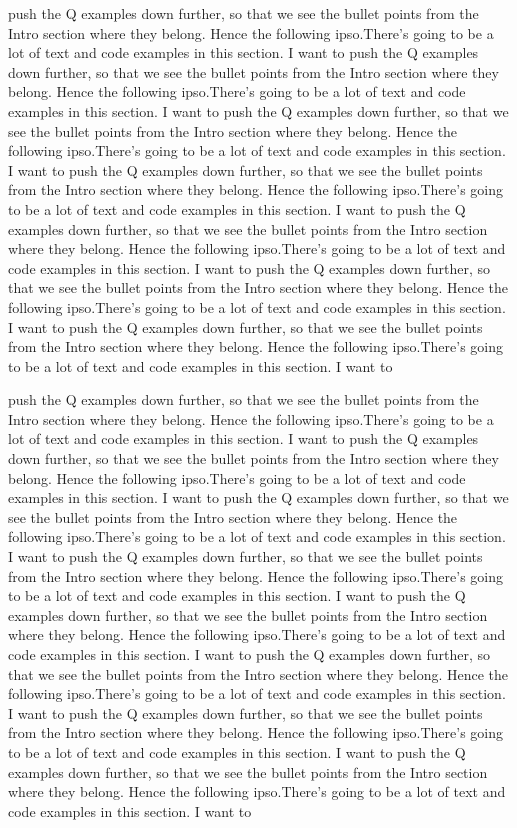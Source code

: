 \documentclass[preprint]{sigplanconf}
\begin{document}
push the Q examples down further, so that we see the bullet points from the
Intro section where they belong.  Hence the following ipso.There's going to be a
lot of text and code examples in this section.  I want to
push the Q examples down further, so that we see the bullet points from the
Intro section where they belong.  Hence the following ipso.There's going to be a
lot of text and code examples in this section.  I want to
push the Q examples down further, so that we see the bullet points from the
Intro section where they belong.  Hence the following ipso.There's going to be a
lot of text and code examples in this section.  I want to
push the Q examples down further, so that we see the bullet points from the
Intro section where they belong.  Hence the following ipso.There's going to be a
lot of text and code examples in this section.  I want to
push the Q examples down further, so that we see the bullet points from the
Intro section where they belong.  Hence the following ipso.There's going to be a
lot of text and code examples in this section.  I want to
push the Q examples down further, so that we see the bullet points from the
Intro section where they belong.  Hence the following ipso.There's going to be a
lot of text and code examples in this section.  I want to
push the Q examples down further, so that we see the bullet points from the
Intro section where they belong.  Hence the following ipso.There's going to be a
lot of text and code examples in this section.  I want to

push the Q examples down further, so that we see the bullet points from the
Intro section where they belong.  Hence the following ipso.There's going to be a
lot of text and code examples in this section.  I want to
push the Q examples down further, so that we see the bullet points from the
Intro section where they belong.  Hence the following ipso.There's going to be a
lot of text and code examples in this section.  I want to
push the Q examples down further, so that we see the bullet points from the
Intro section where they belong.  Hence the following ipso.There's going to be a
lot of text and code examples in this section.  I want to
push the Q examples down further, so that we see the bullet points from the
Intro section where they belong.  Hence the following ipso.There's going to be a
lot of text and code examples in this section.  I want to
push the Q examples down further, so that we see the bullet points from the
Intro section where they belong.  Hence the following ipso.There's going to be a
lot of text and code examples in this section.  I want to
push the Q examples down further, so that we see the bullet points from the
Intro section where they belong.  Hence the following ipso.There's going to be a
lot of text and code examples in this section.  I want to
push the Q examples down further, so that we see the bullet points from the
Intro section where they belong.  Hence the following ipso.There's going to be a
lot of text and code examples in this section.  I want to
push the Q examples down further, so that we see the bullet points from the
Intro section where they belong.  Hence the following ipso.There's going to be a
lot of text and code examples in this section.  I want to
\end{document}
